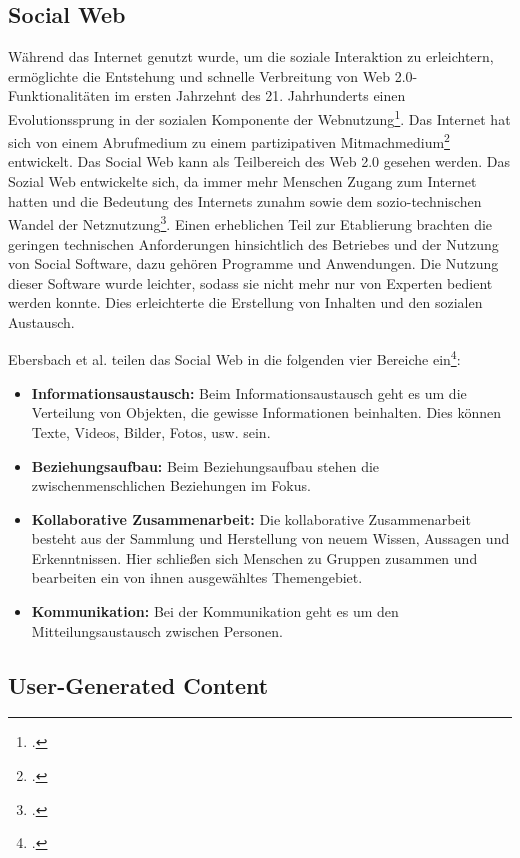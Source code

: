 \subsection{Social Web}

Während das Internet genutzt wurde, um die soziale Interaktion zu erleichtern, ermöglichte die Entstehung und schnelle Verbreitung von Web 2.0-Funktionalitäten im ersten Jahrzehnt des 21. Jahrhunderts einen Evolutionssprung in der sozialen Komponente der Webnutzung\footcite[S. 745-750]{obarSocialMedia}. Das Internet hat sich von einem Abrufmedium zu einem partizipativen Mitmachmedium\footcite{panke} entwickelt. Das Social Web kann als Teilbereich des Web 2.0 gesehen werden. Das Sozial Web entwickelte sich, da immer mehr Menschen Zugang zum Internet hatten und die Bedeutung des Internets zunahm sowie dem sozio-technischen Wandel der Netznutzung\footcite[S. 350]{griesbaum}. Einen erheblichen Teil zur Etablierung brachten die geringen technischen Anforderungen hinsichtlich des Betriebes und der Nutzung von Social Software, dazu gehören Programme und Anwendungen. Die Nutzung dieser Software wurde leichter, sodass sie nicht mehr nur von Experten bedient werden konnte. Dies erleichterte die Erstellung von Inhalten und den sozialen Austausch.

Ebersbach et al. teilen das Social Web in die folgenden vier Bereiche ein\footcite[S. 35-36]{ebersbach}:

\begin{itemize}
	\item \textbf{Informationsaustausch:} Beim Informationsaustausch geht es um die Verteilung von Objekten, die gewisse Informationen beinhalten.  Dies können Texte, Videos, Bilder, Fotos, usw. sein.
	\item \textbf{Beziehungsaufbau:} Beim Beziehungsaufbau stehen die zwischenmenschlichen Beziehungen im Fokus. 
	\item \textbf{Kollaborative Zusammenarbeit:} Die kollaborative Zusammenarbeit besteht aus der Sammlung und Herstellung von neuem Wissen, Aussagen und Erkenntnissen. Hier schließen sich Menschen zu Gruppen zusammen und bearbeiten ein von ihnen ausgewähltes Themengebiet.
	\item \textbf{Kommunikation:} Bei der Kommunikation geht es um den Mitteilungsaustausch zwischen Personen.
\end{itemize}


\subsection{User-Generated Content}

